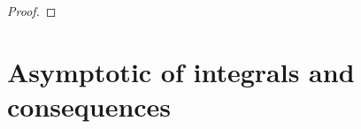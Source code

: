 \documentclass[reqno, 12pt, a4paper]{amsart}
\theoremstyle{plain}
\theoremstyle{definition}
\newcommand{\ced}[1]{\todo[author=\textcolor{white}{\bf{Cedric}},inline]{\textcolor{white}{{\textbf{#1}}}}}
\begin{document}
\begin{proof}
%
%
%
%

\end{proof}



\section{Asymptotic of integrals and consequences}



%
\end{document}
